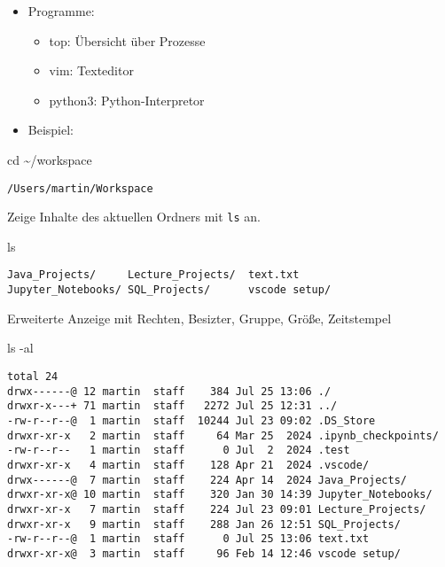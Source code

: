 \documentclass[
  11pt,
  a4paper,
  DIV=11,
  numbers=noendperiod]{scrartcl}
\newenvironment{Shaded}{\begin{snugshade}}{\end{snugshade}}
\newcommand{\NormalTok}[1]{\textcolor[rgb]{0.00,0.23,0.31}{#1}}
\newcommand{\OperatorTok}[1]{\textcolor[rgb]{0.37,0.37,0.37}{#1}}
\providecommand{\tightlist}{%
  \setlength{\itemsep}{0pt}\setlength{\parskip}{0pt}}\usepackage{longtable,booktabs,array}
\begin{document}
\begin{itemize}
\item
  Programme:

  \begin{itemize}
  \tightlist
  \item
    top: Übersicht über Prozesse
  \item
    vim: Texteditor
  \item
    python3: Python-Interpretor
  \end{itemize}
\item
  Beispiel:
\end{itemize}

\begin{Shaded}
\begin{Highlighting}[numbers=left,,]
\NormalTok{cd }\OperatorTok{\textasciitilde{}/}\NormalTok{workspace}
\end{Highlighting}
\end{Shaded}

\begin{verbatim}
/Users/martin/Workspace
\end{verbatim}

Zeige Inhalte des aktuellen Ordners mit \texttt{ls} an.

\begin{Shaded}
\begin{Highlighting}[numbers=left,,]
\NormalTok{ls}
\end{Highlighting}
\end{Shaded}

\begin{verbatim}
Java_Projects/     Lecture_Projects/  text.txt
Jupyter_Notebooks/ SQL_Projects/      vscode setup/
\end{verbatim}

Erweiterte Anzeige mit Rechten, Besizter, Gruppe, Größe, Zeitstempel

\begin{Shaded}
\begin{Highlighting}[numbers=left,,]
\NormalTok{ls }\OperatorTok{{-}}\NormalTok{al}
\end{Highlighting}
\end{Shaded}

\begin{verbatim}
total 24
drwx------@ 12 martin  staff    384 Jul 25 13:06 ./
drwxr-x---+ 71 martin  staff   2272 Jul 25 12:31 ../
-rw-r--r--@  1 martin  staff  10244 Jul 23 09:02 .DS_Store
drwxr-xr-x   2 martin  staff     64 Mar 25  2024 .ipynb_checkpoints/
-rw-r--r--   1 martin  staff      0 Jul  2  2024 .test
drwxr-xr-x   4 martin  staff    128 Apr 21  2024 .vscode/
drwx------@  7 martin  staff    224 Apr 14  2024 Java_Projects/
drwxr-xr-x@ 10 martin  staff    320 Jan 30 14:39 Jupyter_Notebooks/
drwxr-xr-x   7 martin  staff    224 Jul 23 09:01 Lecture_Projects/
drwxr-xr-x   9 martin  staff    288 Jan 26 12:51 SQL_Projects/
-rw-r--r--@  1 martin  staff      0 Jul 25 13:06 text.txt
drwxr-xr-x@  3 martin  staff     96 Feb 14 12:46 vscode setup/
\end{verbatim}
\end{document}
